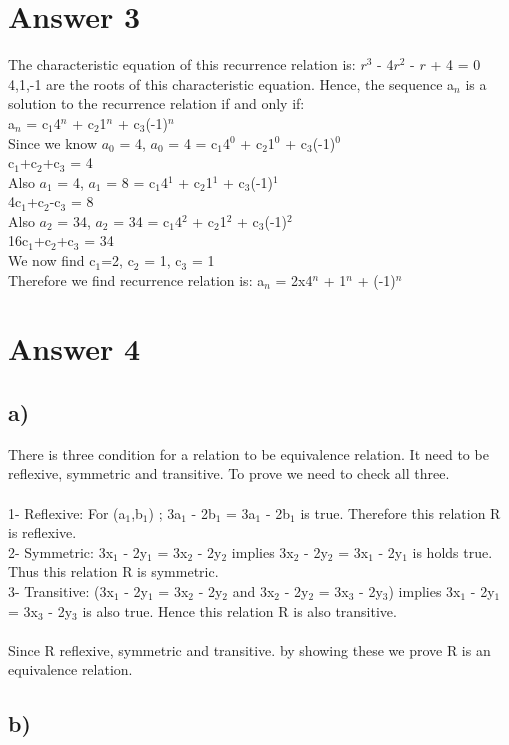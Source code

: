 \documentclass[12pt]{article}
\begin{document}
\section*{Answer 3}

The characteristic equation of this recurrence relation is: $r^3$ - 4$r^2$ - $r$  + 4 = 0\\
4,1,-1 are the roots of this characteristic equation. Hence, the sequence a$_n$
is a solution to the recurrence relation if and only if:\\
a$_n$ = c$_1$4$^n$ + c$_2$1$^n$ +  c$_3$(-1)$^n$\\
Since we know $a_0$ = 4, $a_0$ = 4 = c$_1$4$^0$ + c$_2$1$^0$ +  c$_3$(-1)$^0$ \\ c$_1$+c$_2$+c$_3$ = 4\\
Also $a_1$ = 4, $a_1$ = 8 = c$_1$4$^1$ + c$_2$1$^1$ +  c$_3$(-1)$^1$\\ 4c$_1$+c$_2$-c$_3$ = 8\\
Also $a_2$ = 34, $a_2$ = 34 = c$_1$4$^2$ + c$_2$1$^2$ +  c$_3$(-1)$^2$\\ 16c$_1$+c$_2$+c$_3$ = 34\\
We now find c$_1$=2, c$_2$ = 1, c$_3$ = 1\\
Therefore we find recurrence relation is: a$_n$ = 2x4$^n$ + 1$^n$ +  (-1)$^n$\\

\section*{Answer 4}
\subsection*{a)}
There is three condition for a relation to be equivalence relation. It need to be reflexive, symmetric and transitive. To prove we need to check all three.\\
\\
1- Reflexive: For (a$_1$,b$_1$) ; 3a$_1$ - 2b$_1$ = 3a$_1$ - 2b$_1$ is true. Therefore this relation R is reflexive.\\
2- Symmetric: 3x$_1$ - 2y$_1$ = 3x$_2$ - 2y$_2$ implies 3x$_2$ - 2y$_2$ = 3x$_1$ - 2y$_1$ is holds true. Thus this relation R is symmetric. \\
3- Transitive: (3x$_1$ - 2y$_1$ = 3x$_2$ - 2y$_2$ and 3x$_2$ - 2y$_2$ = 3x$_3$ - 2y$_3$) implies 3x$_1$ - 2y$_1$ = 3x$_3$ - 2y$_3$ is also true. Hence this relation R is also transitive.\\
\\
Since R reflexive, symmetric and transitive. by showing these we prove R is an equivalence relation.
\subsection*{b)}



\end{document}

